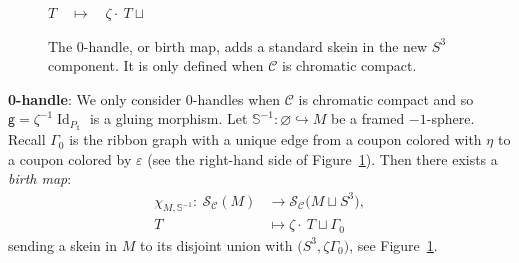 \documentclass[10pt,a4paper]{amsart}
\numberwithin{equation}{section}
\newcommand{\gm}{{\mathsf{g}}}
\numberwithin{theorem}{section}
\numberwithin{proposition}{section}
\numberwithin{definition}{section}
\numberwithin{lemma}{section}
\numberwithin{corollary}{section}
\numberwithin{remark}{section}
\numberwithin{example}{section}
\newcommand{\cat}{\mathcal{C}}
\newcommand{\unit}{\ensuremath{\mathds{1}}}
\newcommand{\Id}{\operatorname{Id}}
\newcommand{\ve}{\varepsilon}
\newcommand{\CC}{\mathcal{C}}
\newcommand{\TSkein}{{\mathscr{S}}}
\newcommand{\Sp}{\mathbb{S}}
\begin{document}
\begin{figure}[t]
 \centering
 $T \quad \mapsto \quad \zeta\cdot\ T\sqcup$
\caption{The 0-handle, or birth map, adds a standard skein in the new $S^3$ component. It is only defined when $\CC$ is chromatic compact.}
 \label{fig:0handle}
\end{figure}
\textbf{0-handle}: We only consider 0-handles when $\cat$ is
chromatic compact and so $\gm=\zeta^{-1}\Id_{P_\unit}$ is a gluing morphism.
Let $\Sp^{-1}\colon \varnothing\hookrightarrow M$ be a framed $-1$-sphere. Recall $\Gamma_0$ is the ribbon graph with a unique edge from a
coupon colored with $\eta$ to a coupon colored by $\ve$ (see the right-hand side of Figure~\ref{fig:0handle}). Then there exists a \emph{birth map}:
\begin{align*}
\chi _{M,{\Sp^{-1}}}\colon\ \TSkein_\cat(M)&{}\to\TSkein_\cat\bigl(M\sqcup S^3\bigr),\\
 T &{}\mapsto \zeta\cdot\ T\sqcup\Gamma_0
\end{align*}
sending a skein in $M$ to its disjoint union with $\bigl(S^3,\zeta\Gamma_0\bigr)$, see Figure~\ref{fig:0handle}.
\end{document}
